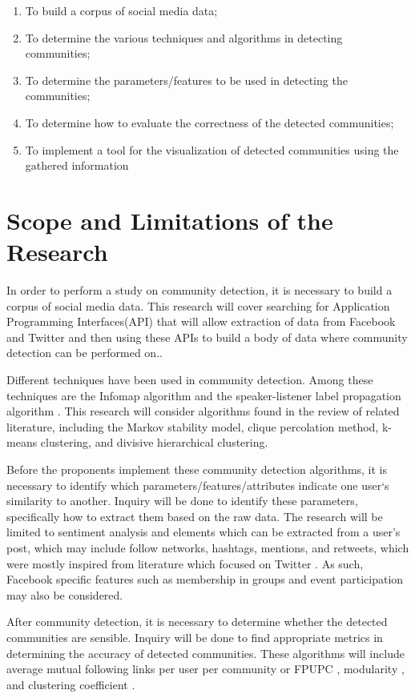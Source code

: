 \begin{enumerate}
	\item To build a corpus of social media data;
	\item To determine the various techniques and algorithms in detecting communities;
	\item To determine the parameters/features to be used in detecting the communities;
	\item To determine how to evaluate the correctness of the detected communities;
	\item To implement a tool for the visualization of detected communities using the gathered information
\end{enumerate}

\section{Scope and Limitations of the Research}
\label{sec:scopelimitations}

In order to perform a study on community detection, it is necessary to build a corpus of social media data. This research will cover searching for Application Programming Interfaces(API) that will allow extraction of data from Facebook and Twitter and then using these APIs to build a body of data where community detection can be performed on..

Different techniques have been used in community detection. Among these techniques are the Infomap algorithm and the speaker-listener label propagation algorithm \cite{Deitrick:2013}.  This research will consider algorithms found in the review of related literature, including the Markov stability model, clique percolation method, k-means clustering, and divisive hierarchical clustering.

Before the proponents implement these community detection algorithms, it is necessary to identify which parameters/features/attributes indicate one user`s similarity to another. Inquiry will be done to identify these parameters, specifically how to extract them based on the raw data. The research will be limited to sentiment analysis and elements which can be extracted from a user’s post, which may include follow networks, hashtags, mentions, and retweets, which were mostly inspired from literature which focused on Twitter \cite{Deitrick:2013,Zhang:2012,Lim:2012:1}. As such, Facebook specific features such as membership in groups and event participation may also be considered.

After community detection, it is necessary to determine whether the detected communities are sensible. Inquiry will be done to find appropriate metrics in determining the accuracy of detected communities. These algorithms will include average mutual following links per user per community or FPUPC \cite{Zhang:2012}, modularity \cite{Deitrick:2013}, and clustering coefficient \cite{Lim:2012:1}.

